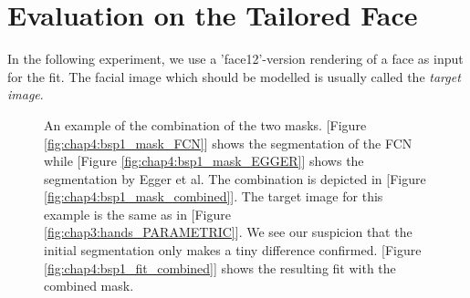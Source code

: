 \section{Evaluation on the Tailored Face}
In the following experiment, we use a 'face12'-version rendering of a face as input for the fit. The facial image which should be modelled is usually called the \textit{target image}.
\begin{figure}
\centering
{}
\caption{An example of the combination of the two masks. [Figure \ref{fig:chap4:bsp1_mask_FCN}] shows the segmentation of the FCN while [Figure \ref{fig:chap4:bsp1_mask_EGGER}] shows the segmentation by Egger et al. The combination is depicted in [Figure \ref{fig:chap4:bsp1_mask_combined}]. The target image for this example is the same as in [Figure \ref{fig:chap3:hands_PARAMETRIC}]. We see our suspicion that the initial segmentation only makes a tiny difference confirmed. [Figure \ref{fig:chap4:bsp1_fit_combined}] shows the resulting fit with the combined mask.}
\label{fig:chap4:bsp1}
\end{figure}

